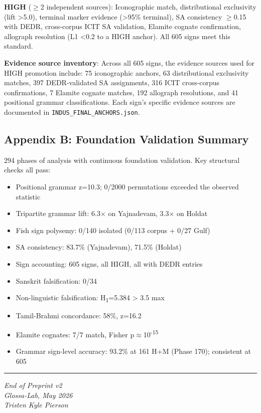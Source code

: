 \documentclass[
  11pt,
]{article}
\providecommand{\tightlist}{%
  \setlength{\itemsep}{0pt}\setlength{\parskip}{0pt}}
\begin{document}
\textbf{HIGH} ($\geq$2 independent sources): Iconographic match,
distributional exclusivity (lift \textgreater5.0), terminal marker
evidence (\textgreater95\% terminal), SA consistency $\geq$0.15 with DEDR,
cross-corpus ICIT SA validation, Elamite cognate confirmation,
allograph resolution (L1 \textless0.2 to a HIGH anchor). All 605 signs
meet this standard.

\textbf{Evidence source inventory}: Across all 605 signs, the evidence
sources used for HIGH promotion include: 75 iconographic anchors, 63
distributional exclusivity matches, 397 DEDR-validated SA assignments,
316 ICIT cross-corpus confirmations, 7 Elamite cognate matches,
192 allograph resolutions, and 41 positional grammar classifications.
Each sign's specific evidence sources are documented in
\texttt{INDUS\_FINAL\_ANCHORS.json}.

\subsection{Appendix B: Foundation Validation
Summary}\label{appendix-b-foundation-validation-summary}

294 phases of analysis with continuous foundation validation. Key
structural checks all pass:

\begin{itemize}
\tightlist
\item
  Positional grammar z=10.3; 0/2000 permutations exceeded the observed
  statistic
\item
  Tripartite grammar lift: 6.3× on Yajnadevam, 3.3× on Holdat
\item
  Fish sign polysemy: 0/140 isolated (0/113 corpus + 0/27 Gulf)
\item
  SA consistency: 83.7\% (Yajnadevam), 71.5\% (Holdat)
\item
  Sign accounting: 605 signs, all HIGH, all with DEDR entries
\item
  Sanskrit falsification: 0/34
\item
  Non-linguistic falsification: H\textsubscript{1}=5.384 \textgreater{}
  3.5 max
\item
  Tamil-Brahmi concordance: 58\%, z=16.2
\item
  Elamite cognates: 7/7 match, Fisher p$\approx$10\textsuperscript{-15}
\item
  Grammar sign-level accuracy: 93.2\% at 161 H+M (Phase 170); consistent
  at 605
\end{itemize}

\begin{center}\rule{0.5\linewidth}{0.5pt}\end{center}

\emph{End of Preprint v2}\\
\emph{Glossa-Lab, May 2026}\\
\emph{Tristen Kyle Pierson}
\end{document}
